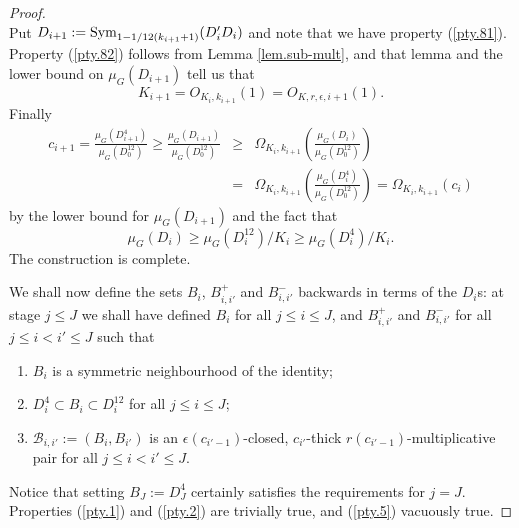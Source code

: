 \documentclass[12pt]{amsart}
\numberwithin{equation}{section}
\theoremstyle{plain}
\theoremstyle{definition}
\renewcommand{\leq}{\leqslant}
\renewcommand{\geq}{\geqslant}
\providecommand{\Sym}{\mathop{\rm Sym}\nolimits}
\begin{document}
\begin{proof}
\begin{equation*}
\end{equation*}
Put $D_{i+1}:=\Sym_{1-1/12(k_{i+1}+1)}(D_i'D_i)$ and note that we have property (\ref{pty.81}).  Property (\ref{pty.82}) follows from Lemma \ref{lem.sub-mult}, and that lemma and the lower bound on $\mu_G(D_{i+1})$ tell us that
\begin{equation*}
K_{i+1}=O_{K_i,k_{i+1}}(1)=O_{K,r,\epsilon,i+1}(1).
\end{equation*}
Finally
\begin{eqnarray*}
c_{i+1} = \frac{\mu_G(D_{i+1}^4)}{\mu_G(D_0^{12})} \geq \frac{\mu_G(D_{i+1})}{\mu_G(D_0^{12})}& \geq & \Omega_{K_i,k_{i+1}}\left(\frac{\mu_G(D_{i})}{\mu_G(D_0^{12})}\right)\\&=&\Omega_{K_i,k_{i+1}}\left(\frac{\mu_G(D_{i}^4)}{\mu_G(D_0^{12})}\right)=\Omega_{K_i,k_{i+1}}(c_{i})
\end{eqnarray*}
by the lower bound for $\mu_G(D_{i+1})$ and the fact that
\begin{equation*}
\mu_G(D_i) \geq \mu_G(D_i^{12})/K_i \geq \mu_G(D_i^4)/K_i.
\end{equation*}
The construction is complete.

We shall now define the sets $B_i$, $B_{i,i'}^+$ and $B_{i,i'}^-$ backwards in terms of the $D_i$s: at stage $j \leq J$ we shall have defined $B_i$ for all $j \leq i \leq J$, and $B_{i,i'}^+$ and $B_{i,i'}^-$ for all  $j \leq i < i' \leq J$ such that
\begin{enumerate}
\item \label{pty.1} $B_i$ is a symmetric neighbourhood of the identity;
\item \label{pty.2} $D_i^4 \subset B_i \subset D_i^{12}$ for all $j \leq i \leq J$;
\item \label{pty.5} $\mathcal{B}_{i,i'}:=(B_i,B_{i'})$ is an $\epsilon(c_{i'-1})$-closed, $c_{i'}$-thick $r(c_{i'-1})$-multiplicative pair for all $j \leq i < i' \leq J$.
\end{enumerate}
Notice that setting $B_J:=D_J^4$ certainly satisfies the requirements for $j=J$.  Properties (\ref{pty.1}) and (\ref{pty.2}) are trivially true, and (\ref{pty.5}) vacuously true.


\end{proof}
\end{document}
